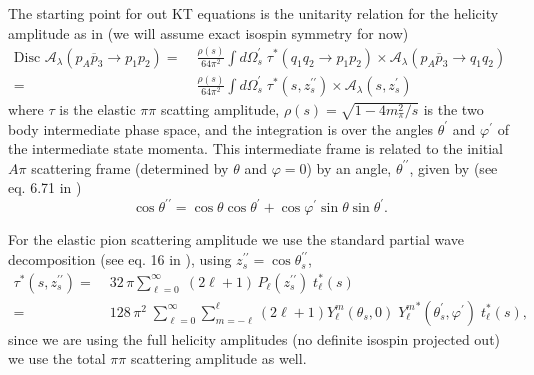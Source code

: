 \documentclass[10pt, aps,prd,amsmath,amssymb,superscriptaddress,onecolumn,
nofootinbib,showpacs,preprintnumbers]{revtex4-1}
\newcommand{\Disc}{\text{Disc }}
\begin{document}
The starting point for out KT equations is the unitarity relation for the helicity amplitude as in \cite{Danilkin:2014cra} (we will assume exact isospin symmetry for now)
  \begin{align}
    \label{eq:unitarity}
    \Disc \mathcal{A}_\lambda(p_A \overline{p}_3 \to p_1 p_2 ) =&\; \frac{\rho(s)}{64 \pi^2} \int d\Omega_s^\prime  \; \tau^*(q_1q_2 \to p_1p_2) \times \mathcal{A}_\lambda(p_A \overline{p}_{3} \to q_1 q_2 ) \nonumber \\
    =& \; \frac{\rho(s)}{64 \pi^2} \int d\Omega_s^\prime  \; \tau^*(s,z_s^{\prime\prime}) \times \mathcal{A}_\lambda(s,z_s^{\prime})
  \end{align}
where \(\tau\) is the elastic \(\pi\pi\) scatting amplitude, \(\rho(s) = \sqrt{1 - 4m_\pi^2/s}\) is the two body intermediate phase space, and the integration is over the angles \(\theta^\prime\) and \(\varphi^\prime\) of the intermediate state momenta. This intermediate frame is related to the initial \(A\pi\) scattering frame (determined by \(\theta\) and \(\varphi = 0\)) by an angle, \(\theta^{\prime\prime}\), given by (see eq. 6.71 in \cite{MS})
  \begin{equation}
    \cos \theta^{\prime\prime} = \cos \theta \cos \theta^\prime + \cos \varphi^\prime \sin\theta \sin \theta^\prime.
  \end{equation}

For the elastic pion scattering amplitude we use the standard partial wave decomposition (see eq. 16 in \cite{Danilkin:2014cra}), using \( z_s^{\prime\prime} = \cos \theta_s^{\prime\prime}\),
  \begin{align}
    \label{eq:elastic-pion}
    \tau^*(s, z_s^{\prime\prime}) =& \; 32 \, \pi \sum_{\ell=0  }^\infty \; (2\ell+1) \, P_{\ell}(z_s^{\prime\prime}) \; t_\ell^*(s) \nonumber \\
    =& \; 128 \, \pi^2 \; \sum_{\ell=0}^\infty \sum_{m=-\ell}^{\ell} (2\ell +1 ) Y^m_\ell(\theta_s,0) \; {Y^m_\ell}^*(\theta_s^\prime, \varphi^\prime) \; t_\ell^*(s),
  \end{align}
since we are using the full helicity amplitudes (no definite isospin projected out) we use the total \(\pi\pi\) scattering amplitude as well.
\end{document}
